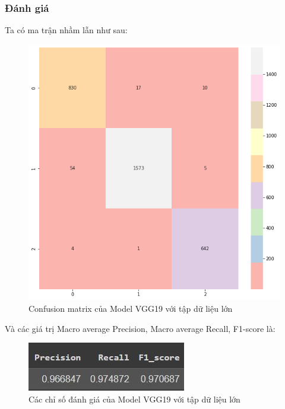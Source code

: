 \subsubsection{Đánh giá}
Ta có ma trận nhầm lẫn như sau:
\begin{center}
    \begin{figure}[!h]
        \centering
        \includegraphics[scale = 0.4]{fileanh/vgg19_increase1.png}
        \caption{Confusion matrix của Model VGG19 với tập dữ liệu lớn}
    \end{figure}
\end{center}
\newpage
Và các giá trị Macro average Precision, Macro average Recall, F1-score là:
\begin{center}
    \begin{figure}[!h]
        \centering
        \includegraphics[scale = 1.2]{fileanh/vgg19_increase2.jpg}
        \caption{Các chỉ số đánh giá của Model VGG19 với tập dữ liệu lớn}
    \end{figure}
\end{center}






